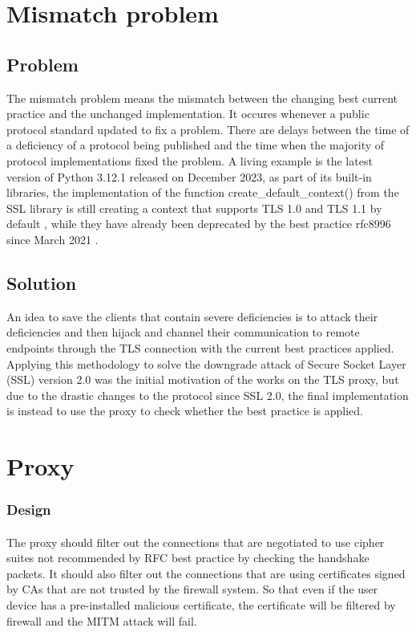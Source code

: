 \documentclass[mscthesis]{usiinfthesis}
\begin{document}
\section{Mismatch problem}
\subsection{Problem}
The mismatch problem means the mismatch between the changing best current practice and the unchanged implementation. It occures whenever a public protocol standard updated to fix a problem. There are delays between the time of a deficiency of a protocol being published and the time when the majority of protocol implementations fixed the problem. A living example is the latest version of Python 3.12.1 released on December 2023, as part of its built-in libraries, the implementation of the function create\_default\_context() from the SSL library is still creating a context that supports TLS 1.0 and TLS 1.1 by default \citep{pyton:ssl}, while they have already been deprecated by the best practice rfc8996 since March 2021 \citep{rfc:notls11}.

\subsection{Solution}
An idea to save the clients that contain severe deficiencies is to attack their deficiencies and then hijack and channel their communication to remote endpoints through the TLS connection with the current best practices applied. Applying this methodology to solve the downgrade attack of Secure Socket Layer (SSL) version 2.0 was the initial motivation of the works on the TLS proxy, but due to the drastic changes to the protocol since SSL 2.0, the final implementation is instead to use the proxy to check whether the best practice is applied.


\section{Proxy}
\subsubsection{Design}
\paragraph{}
The proxy should filter out the connections that are negotiated to use cipher suites not recommended by RFC best practice by checking the handshake packets. It should also filter out the connections that are using certificates signed by CAs that are not trusted by the firewall system. So that even if the user device has a pre-installed malicious certificate, the certificate will be filtered by firewall and the MITM attack will fail.
\end{document}
